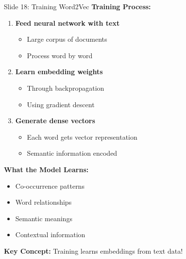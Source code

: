 \documentclass[8pt]{beamer}
\begin{document}
	\begin{frame}{Slide 18: Training Word2Vec}
		\fontsize{6.5}{7.5}\selectfont
		\textbf{Training Process:}
		\begin{enumerate}
			\item \textbf{Feed neural network with text}
			\begin{itemize}
				\item Large corpus of documents
				\item Process word by word
			\end{itemize}
			\item \textbf{Learn embedding weights}
			\begin{itemize}
				\item Through backpropagation
				\item Using gradient descent
			\end{itemize}
			\item \textbf{Generate dense vectors}
			\begin{itemize}
				\item Each word gets vector representation
				\item Semantic information encoded
			\end{itemize}
		\end{enumerate}
		
		\vspace{0.1cm}
		\textbf{What the Model Learns:}
		\begin{itemize}
			\item Co-occurrence patterns
			\item Word relationships
			\item Semantic meanings
			\item Contextual information
		\end{itemize}
		
		\textcolor{myblue}{\textbf{Key Concept:}} Training learns embeddings from text data!
	\end{frame}
	
\end{document}
